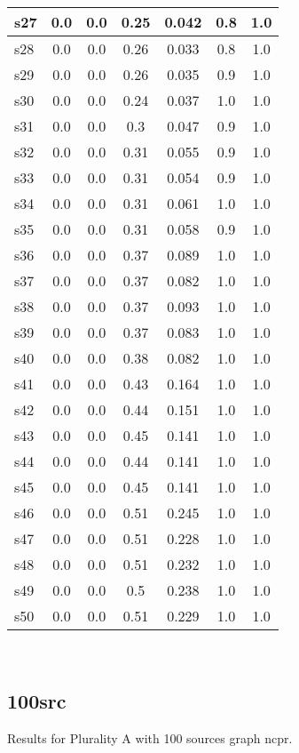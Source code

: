 \documentclass{article}
\begin{document}
\begin{tabular}{|l|c|c|c|c|c|c|}
\hline
s27 &0.0 & 0.0 & 0.25 & 0.042 & 0.8 & 1.0\\
\hline
s28 &0.0 & 0.0 & 0.26 & 0.033 & 0.8 & 1.0\\
\hline
s29 &0.0 & 0.0 & 0.26 & 0.035 & 0.9 & 1.0\\
\hline
s30 &0.0 & 0.0 & 0.24 & 0.037 & 1.0 & 1.0\\
\hline
s31 &0.0 & 0.0 & 0.3 & 0.047 & 0.9 & 1.0\\
\hline
s32 &0.0 & 0.0 & 0.31 & 0.055 & 0.9 & 1.0\\
\hline
s33 &0.0 & 0.0 & 0.31 & 0.054 & 0.9 & 1.0\\
\hline
s34 &0.0 & 0.0 & 0.31 & 0.061 & 1.0 & 1.0\\
\hline
s35 &0.0 & 0.0 & 0.31 & 0.058 & 0.9 & 1.0\\
\hline
s36 &0.0 & 0.0 & 0.37 & 0.089 & 1.0 & 1.0\\
\hline
s37 &0.0 & 0.0 & 0.37 & 0.082 & 1.0 & 1.0\\
\hline
s38 &0.0 & 0.0 & 0.37 & 0.093 & 1.0 & 1.0\\
\hline
s39 &0.0 & 0.0 & 0.37 & 0.083 & 1.0 & 1.0\\
\hline
s40 &0.0 & 0.0 & 0.38 & 0.082 & 1.0 & 1.0\\
\hline
s41 &0.0 & 0.0 & 0.43 & 0.164 & 1.0 & 1.0\\
\hline
s42 &0.0 & 0.0 & 0.44 & 0.151 & 1.0 & 1.0\\
\hline
s43 &0.0 & 0.0 & 0.45 & 0.141 & 1.0 & 1.0\\
\hline
s44 &0.0 & 0.0 & 0.44 & 0.141 & 1.0 & 1.0\\
\hline
s45 &0.0 & 0.0 & 0.45 & 0.141 & 1.0 & 1.0\\
\hline
s46 &0.0 & 0.0 & 0.51 & 0.245 & 1.0 & 1.0\\
\hline
s47 &0.0 & 0.0 & 0.51 & 0.228 & 1.0 & 1.0\\
\hline
s48 &0.0 & 0.0 & 0.51 & 0.232 & 1.0 & 1.0\\
\hline
s49 &0.0 & 0.0 & 0.5 & 0.238 & 1.0 & 1.0\\
\hline
s50 &0.0 & 0.0 & 0.51 & 0.229 & 1.0 & 1.0\\
\hline
\end{tabular}\\

\newpage

\subsection{100src}

\noindent Results for Plurality A with 100 sources graph ncpr.
\end{document}
